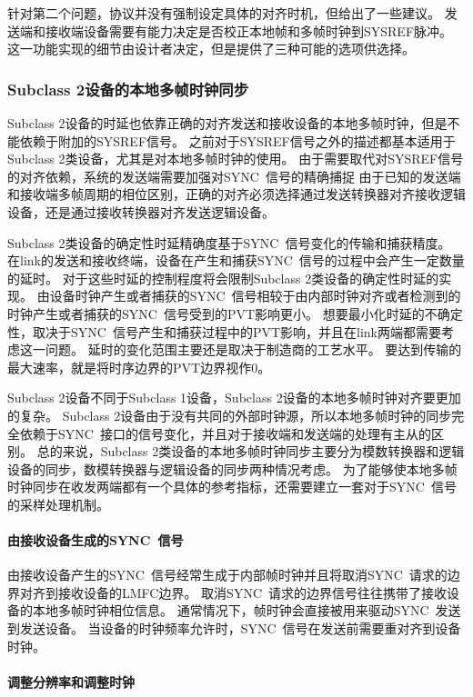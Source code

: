 \documentclass[UTF8]{ctexart}
\begin{document}
针对第二个问题，协议并没有强制设定具体的对齐时机，但给出了一些建议。
发送端和接收端设备需要有能力决定是否校正本地帧和多帧时钟到SYSREF脉冲。
这一功能实现的细节由设计者决定，但是提供了三种可能的选项供选择。

\subsubsection{Subclass 2设备的本地多帧时钟同步}

Subclass 2设备的时延也依靠正确的对齐发送和接收设备的本地多帧时钟，但是不能依赖于附加的SYSREF信号。
之前对于SYSREF信号之外的描述都基本适用于Subclass 2类设备，尤其是对本地多帧时钟的使用。
由于需要取代对SYSREF信号的对齐依赖，系统的发送端需要加强对SYNC~信号的精确捕捉
由于已知的发送端和接收端多帧周期的相位区别，正确的对齐必须选择通过发送转换器对齐接收逻辑设备，还是通过接收转换器对齐发送逻辑设备。

Subclass 2类设备的确定性时延精确度基于SYNC~信号变化的传输和捕获精度。
在link的发送和接收终端，设备在产生和捕获SYNC~信号的过程中会产生一定数量的延时。
对于这些时延的控制程度将会限制Subclass 2类设备的确定性时延的实现。
由设备时钟产生或者捕获的SYNC~信号相较于由内部时钟对齐或者检测到的时钟产生或者捕获的SYNC~信号受到的PVT影响更小。
想要最小化时延的不确定性，取决于SYNC~信号产生和捕获过程中的PVT影响，并且在link两端都需要考虑这一问题。
延时的变化范围主要还是取决于制造商的工艺水平。
要达到传输的最大速率，就是将时序边界的PVT边界视作0。

Subclass 2设备不同于Subclass 1设备，Subclass 2设备的本地多帧时钟对齐要更加的复杂。
Subclass 2设备由于没有共同的外部时钟源，所以本地多帧时钟的同步完全依赖于SYNC~接口的信号变化，并且对于接收端和发送端的处理有主从的区别。
总的来说，Subclass 2类设备的本地多帧时钟同步主要分为模数转换器和逻辑设备的同步，数模转换器与逻辑设备的同步两种情况考虑。
为了能够使本地多帧时钟同步在收发两端都有一个具体的参考指标，还需要建立一套对于SYNC~信号的采样处理机制。

\paragraph{由接收设备生成的SYNC~信号}

由接收设备产生的SYNC~信号经常生成于内部帧时钟并且将取消SYNC~请求的边界对齐到接收设备的LMFC边界。
取消SYNC~请求的边界信号往往携带了接收设备的本地多帧时钟相位信息。
通常情况下，帧时钟会直接被用来驱动SYNC~发送到发送设备。
当设备的时钟频率允许时，SYNC~信号在发送前需要重对齐到设备时钟。

\paragraph{调整分辨率和调整时钟}
\end{document}
